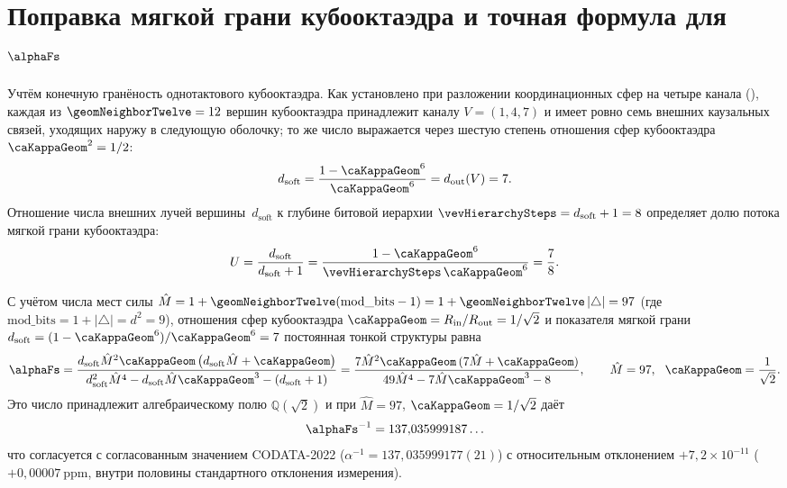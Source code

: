 \section{Поправка мягкой грани кубооктаэдра и точная формула для $\alphaFs$}

Учтём конечную гранёность однотактового кубооктаэдра.
Как установлено при разложении координационных сфер на четыре канала (), каждая из $\geomNeighborTwelve = 12$ вершин кубооктаэдра принадлежит каналу $V = (1,4,7)$ и имеет ровно семь внешних каузальных связей, уходящих наружу в следующую оболочку; то же число выражается через шестую степень отношения сфер кубооктаэдра $\caKappaGeom^2 = 1/2$:
\[
  d_{\mathrm{soft}} = \frac{1 - \caKappaGeom^6}{\caKappaGeom^6} = d_{\mathrm{out}}(V) = 7.
\]
Отношение числа внешних лучей вершины~$d_{\mathrm{soft}}$ к глубине битовой иерархии $\vevHierarchySteps = d_{\mathrm{soft}} + 1 = 8$ определяет долю потока мягкой грани кубооктаэдра:
\[
  U = \frac{d_{\mathrm{soft}}}{d_{\mathrm{soft}} + 1} = \frac{1 - \caKappaGeom^6}{\vevHierarchySteps\,\caKappaGeom^6} = \frac{7}{8}.
\]

\begin{theorem}
\label{thm:alpha}
С учётом числа мест силы $\hat M = 1 + \geomNeighborTwelve(\mathrm{mod\_bits} - 1) = 1 + \geomNeighborTwelve\,|\triangle| = 97$ (где $\mathrm{mod\_bits} = 1 + |\triangle| = d^2 = 9$), отношения сфер кубооктаэдра $\caKappaGeom = R_{\mathrm{in}}/R_{\mathrm{out}} = 1/\sqrt{2}$ и показателя мягкой грани $d_{\mathrm{soft}} = (1-\caKappaGeom^6)/\caKappaGeom^6 = 7$ постоянная тонкой структуры равна
\[
  \alphaFs
  =
  \frac{d_{\mathrm{soft}}\hat M^{2}\caKappaGeom\,\bigl(d_{\mathrm{soft}}\hat M + \caKappaGeom\bigr)}
       {d_{\mathrm{soft}}^{2}\hat M^{4} - d_{\mathrm{soft}}\hat M\caKappaGeom^{3} - (d_{\mathrm{soft}} + 1)}
  =
  \frac{7\hat M^{2}\caKappaGeom\,(7\hat M + \caKappaGeom)}
       {49\hat M^{4} - 7\hat M\caKappaGeom^{3} - 8},
  \qquad \hat M = 97,\ \ \caKappaGeom = \frac{1}{\sqrt{2}}.
\]
Это число принадлежит алгебраическому полю $\mathbb{Q}(\sqrt{2})$ и при $\hat M = 97$, $\caKappaGeom = 1/\sqrt{2}$ даёт
\[
  \alphaFs^{-1} = 137{,}035999187\ldots
\]
что согласуется с согласованным значением CODATA-2022 ($\alpha^{-1} = 137{,}035999177(21)$) с относительным отклонением $+7{,}2\times 10^{-11}$ ($+0{,}00007\ \mathrm{ppm}$, внутри половины стандартного отклонения измерения).
\end{theorem}

